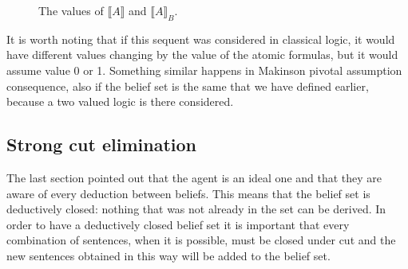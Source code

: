 \documentclass[a4paper, 12pt, oneside]{article}
\theoremstyle{plain}
\theoremstyle{definition}
\begin{document}
	\begin{figure}[h]
	\begin{centering}
		
	\end{centering}
	\caption{The values of $\llbracket A \rrbracket$ and $\llbracket A \rrbracket_B$.}
	\label{fig:valuesq}
\end{figure}


It is worth noting that if this sequent was considered in classical logic, it would have different values changing by the value of the atomic formulas, but it would assume value 0 or 1. Something similar happens in Makinson pivotal assumption consequence, also if the belief set is the same that we have defined earlier, because a two valued logic is there considered. 



\subsection{Strong cut elimination} 

\label{sec:importance_of_cut}

The last section pointed out that the agent is an ideal one and that they are aware of every deduction between beliefs. This means that the belief set is deductively closed: nothing that was not already in the set can be derived.  In order to have a deductively closed belief set it is important that every combination of sentences, when it is possible, must be closed under cut and the new sentences obtained in this way will be added to the belief set. 
\end{document}
